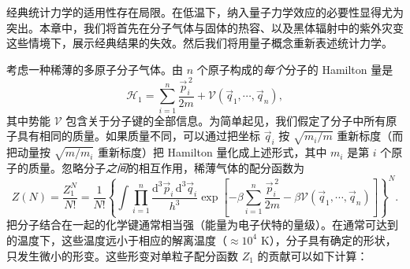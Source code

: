 
经典统计力学的适用性存在局限。在低温下，纳入量子力学效应的必要性显得尤为突出。本章中，我们将首先在分子气体与固体的热容、以及黑体辐射中的紫外灾变这些情境下，展示经典结果的失效。然后我们将用量子概念重新表述统计力学。


考虑一种稀薄的多原子分子气体。由 $n$ 个原子构成的\emph{每个}分子的 Hamilton 量是
\begin{equation}\label{eq:6.1}
\mathscr H_1=\sum_{i=1}^n\frac{\vec p_i^{\,2}}{2m}+\mathcal V(\vec q_1,\cdots,\vec q_n),
\end{equation}
其中势能 $\mathcal V$ 包含关于分子键的全部信息。为简单起见，我们假定了分子中所有原子具有相同的质量。如果质量不同，可以通过把坐标 $\vec q_i$ 按 $\sqrt{m_i/m}$ 重新标度（而把动量按 $\sqrt{m/m_i}$ 重新标度）把 Hamilton 量化成上述形式，其中 $m_i$ 是第 $i$ 个原子的质量。忽略分子\emph{之间}的相互作用，稀薄气体的配分函数为
\begin{equation}\label{eq:6.2}
Z(N)=\frac{Z_1^N}{N!}=\frac1{N!}\left\{\int\prod_{i=1}^n\frac{\mathrm d^3\vec p_i\,\mathrm d^3\vec q_i}{h^3}\exp\left[-\beta\sum_{i=1}^n\frac{\vec p_i^{\,2}}{2m}-\beta\mathcal V(\vec q_1,\cdots,\vec q_n)\right]\right\}^N.
\end{equation}
把分子结合在一起的化学键通常相当强（能量为电子伏特的量级）。在通常可达到的温度下，这些温度远小于相应的解离温度（$\approx10^4$ K），分子具有确定的形状，只发生微小的形变。这些形变对单粒子配分函数 $Z_1$ 的贡献可以如下计算：

